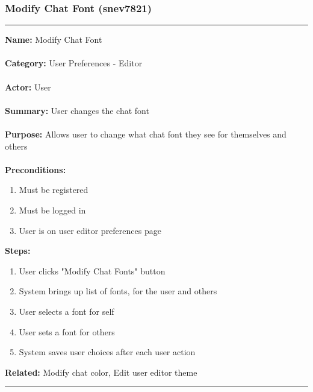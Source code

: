 \documentclass[11pt]{report}
\begin{document}
\subsubsection{Modify Chat Font (snev7821)}
\vspace{2pt}
\hrule
\vspace{8pt}
	\noindent\textbf{Name:} Modify Chat Font \\ \\
	\textbf{Category:} User Preferences - Editor  \\ \\
	\textbf{Actor:} User \\ \\
	\textbf{Summary:} User changes the chat font \\ \\
	\textbf{Purpose:} Allows user to change what chat font they see for themselves and others \\ \\
	\textbf{Preconditions:} 
	\begin{enumerate}
		\item Must be registered
		\item Must be logged in
		\item User is on user editor preferences page
	\end{enumerate}
	\textbf{Steps:}
	\begin{enumerate}
		\item User clicks "Modify Chat Fonts" button
		\item System brings up list of fonts, for the user and others
		\item User selects a font for self
		\item User sets a font for others
		\item System saves user choices after each user action
	\end{enumerate}
	\textbf{Related:} Modify chat color, Edit user editor theme
\vspace{8pt}
\hrule
\newpage
\end{document}
